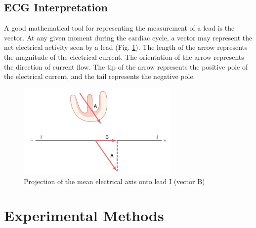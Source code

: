 \documentclass{article}
\begin{document}
\subsection*{ECG Interpretation}
A good mathematical tool for representing the measurement of a lead is the vector. At any given moment during the cardiac cycle, a vector may represent the net electrical activity seen by a lead (Fig. \ref{vector}). The length of the arrow represents the magnitude of the electrical current. The orientation of the arrow represents the direction of current flow. The tip of the arrow represents the positive pole of the electrical current, and the tail represents the negative pole.

\begin{figure}[h]
\centering\includegraphics[width=0.7\textwidth]{../images/ECG_II_3.jpg}
\caption{Projection of the mean electrical axis onto lead I (vector B)}
\label{vector}
\end{figure}

\section*{Experimental Methods}
\end{document}
